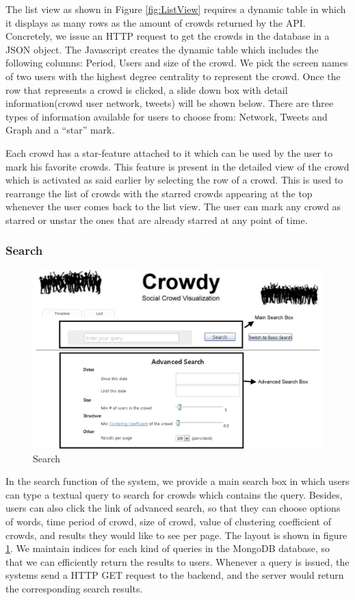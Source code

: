 \documentclass{sig-alternate}
\begin{document}
The list view as shown in Figure \ref{fig:ListView} requires a dynamic table in
which it displays as many rows as the amount of crowds returned by the API.
Concretely, we issue an HTTP request to get the crowds in the database in a
JSON object. The Javascript creates the dynamic table which includes the
following columns: Period, Users and size of the crowd. We pick the screen
names of two users with the highest degree centrality to represent the crowd.
Once the row that represents a crowd is
clicked, a slide down box with detail information(crowd user network, tweets)
will be shown below. There are three types of information available for users
to choose from: Network, Tweets and Graph and a ``star'' mark. 

Each crowd has a star-feature attached to it which can be used by the user to
mark his favorite crowds. This feature is present in the detailed view of the
crowd which is activated as said earlier by selecting the row of a crowd. This
is used to rearrange the list of crowds with the starred crowds appearing at
the top whenever the user comes back to the list view. The user can mark any
crowd as starred or unstar the ones that are already starred at any point of
time. 

\subsubsection{Search}

\begin{figure}
\centering
\includegraphics[width=\linewidth]{imgs/Search.png}
\caption{Search}
\label{fig:Search}
\end{figure}
In the search function of the system, we provide a main search box in which 
users can type a textual query to search for crowds which contains the query.
Besides, users can also click the link of advanced search, so that they can 
choose options of words, time period of crowd, size of crowd, value of clustering coefficient of crowds,
and results they would like to see per page. The layout is shown in figure \ref{fig:Search}. We maintain indices for each kind
of queries in the MongoDB database, so that we can efficiently return the results
to users. Whenever a query is issued, the systems send a HTTP GET request to the
backend, and the server would return the corresponding search results.
\end{document}
